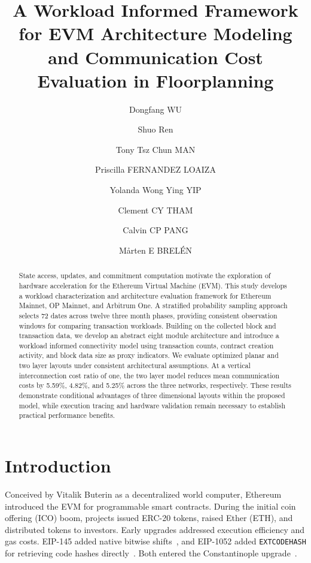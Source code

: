 \documentclass[runningheads]{llncs}
\begin{document}
\raggedbottom
\title{A Workload Informed Framework for EVM Architecture Modeling and Communication Cost Evaluation in Floorplanning}
\author{Dongfang WU \and Shuo Ren \and Tony Tsz Chun MAN \and Priscilla FERNANDEZ LOAIZA \and Yolanda Wong Ying YIP \and Clement CY THAM \and Calvin CP PANG \and M{\aa}rten E BREL{\'E}N}
\maketitle
\begin{abstract}
State access, updates, and commitment computation motivate the exploration of hardware acceleration for the Ethereum Virtual Machine (EVM). This study develops a workload characterization and architecture evaluation framework for Ethereum Mainnet, OP Mainnet, and Arbitrum One. A stratified probability sampling approach selects 72 dates across twelve three month phases, providing consistent observation windows for comparing transaction workloads. Building on the collected block and transaction data, we develop an abstract eight module architecture and introduce a workload informed connectivity model using transaction counts, contract creation activity, and block data size as proxy indicators. We evaluate optimized planar and two layer layouts under consistent architectural assumptions. At a vertical interconnection cost ratio of one, the two layer model reduces mean communication costs by 5.59\%, 4.82\%, and 5.25\% across the three networks, respectively. These results demonstrate conditional advantages of three dimensional layouts within the proposed model, while execution tracing and hardware validation remain necessary to establish practical performance benefits.

\end{abstract}

\section{Introduction}
Conceived by Vitalik Buterin as a decentralized world computer, Ethereum introduced the EVM for programmable smart contracts. During the initial coin offering (ICO) boom, projects issued ERC-20 tokens, raised Ether (ETH), and distributed tokens to investors. Early upgrades addressed execution efficiency and gas costs. EIP-145 added native bitwise shifts~\cite{eip145}, and EIP-1052 added \texttt{EXTCODEHASH} for retrieving code hashes directly~\cite{eip1052}. Both entered the Constantinople upgrade~\cite{constantinople}.
\end{document}
